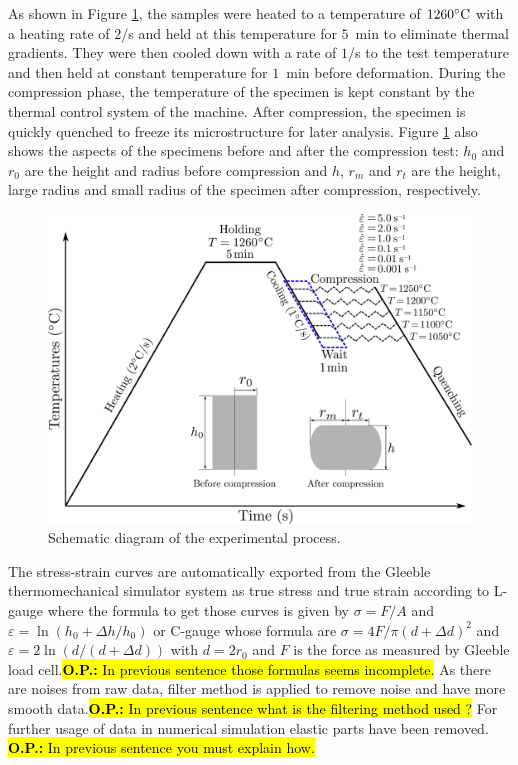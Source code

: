 \documentclass[twoside,english,1p,final,sort&compress]{elsarticle}
\theoremstyle{plain}
\DeclareRobustCommand{\OPP}[1]{\begingroup\sethlcolor{VWyellow}\textcolor{red}{\hl{\textbf{O.P.:} In previous sentence #1}}\endgroup}
\begin{document}
As shown in Figure \ref{fig:GleebleProcess}, the samples were heated to a temperature of $1260\celsius$ with a heating rate of $2$\celsius/s and held at this temperature for $5$~min to eliminate thermal gradients.
They were then cooled down with a rate of $1$\celsius/s to the test temperature and then held at constant temperature for $1$~min before deformation.
During the compression phase, the temperature of the specimen is kept constant by the thermal control system of the machine.
After compression, the specimen is quickly quenched to freeze its microstructure for later analysis.
Figure \ref{fig:GleebleProcess} also shows the aspects of the specimens before and after the compression test: $h_0$ and $r_0$ are the height and radius before compression and $h$, $r_m$ and $r_t$ are the height, large radius and small radius of the specimen after compression, respectively.
\begin{figure}[!ht]
\centering
\includegraphics[width=0.8\columnwidth]{Figures/GleebleProcess}
\caption{Schematic diagram of the experimental process.}
\label{fig:GleebleProcess}
\end{figure}

The stress-strain curves are automatically exported from the Gleeble thermomechanical simulator system as true stress and true strain according to L-gauge where the formula to get those curves is given by $\sigma=F/A$ and $\varepsilon=\ln\left(h_0+\Delta h / h_0\right)$ or C-gauge whose formula are $\sigma = 4F/\pi(d+\Delta d)^2$ and $\varepsilon = 2\ln(d/(d+\Delta d))$ with $d = 2r_0$ and $F$ is the force as measured by Gleeble load cell.\OPP{those formulas seems incomplete.}
As there are noises from raw data, filter method is applied to remove noise and have more smooth data.\OPP{what is the filtering method used ?}
For further usage of data in numerical simulation elastic parts have been removed. \OPP{you must explain how.}
\end{document}
